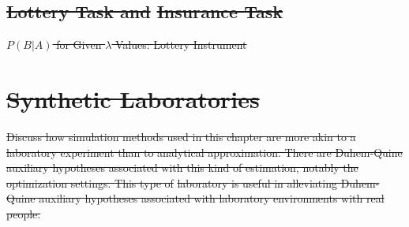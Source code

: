 \documentclass[../main.tex]{subfiles}
\providecommand{\DIFdel}[1]{{\protect\color{red}\sout{#1}}}                      %
\providecommand{\DIFdelbegin}{} %
\providecommand{\DIFdelend}{} %
\providecommand{\DIFdelFL}[1]{\DIFdel{#1}} %
\begin{document}
\DIFdelbegin \subsection{%
\DIFdel{Lottery Task and }%
\DIFdel{Insurance Task}}
\addtocounter{subsection}{-1}%
{%
\DIFdelFL{$P(B|A)$ for Given $\lambda$ Values: \textcite{Hey1994} Lottery Instrument}}
\section{\DIFdel{Synthetic Laboratories}}
\addtocounter{section}{-1}%
\DIFdelend %

\DIFdelbegin \DIFdel{Discuss how simulation methods used in this chapter are more akin to a laboratory experiment than to analytical approximation.
There are Duhem-Quine auxiliary hypotheses associated with this kind of estimation, notably the optimization settings.
This type of }%
\DIFdel{laboratory is useful in alleviating Duhem-Quine auxiliary hypotheses associated with laboratory environments with real people.
}%
\end{document}
